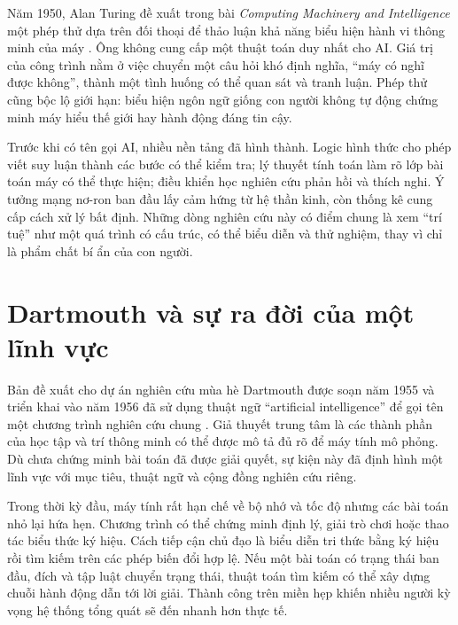 \documentclass[12pt,a4paper]{report}
\begin{document}
Năm 1950, Alan Turing đề xuất trong bài \textit{Computing Machinery and Intelligence} một phép thử dựa trên đối thoại để thảo luận khả năng biểu hiện hành vi thông minh của máy \cite{turing1950}. Ông không cung cấp một thuật toán duy nhất cho AI. Giá trị của công trình nằm ở việc chuyển một câu hỏi khó định nghĩa, ``máy có nghĩ được không'', thành một tình huống có thể quan sát và tranh luận. Phép thử cũng bộc lộ giới hạn: biểu hiện ngôn ngữ giống con người không tự động chứng minh máy hiểu thế giới hay hành động đáng tin cậy.

Trước khi có tên gọi AI, nhiều nền tảng đã hình thành. Logic hình thức cho phép viết suy luận thành các bước có thể kiểm tra; lý thuyết tính toán làm rõ lớp bài toán máy có thể thực hiện; điều khiển học nghiên cứu phản hồi và thích nghi. Ý tưởng mạng nơ-ron ban đầu lấy cảm hứng từ hệ thần kinh, còn thống kê cung cấp cách xử lý bất định. Những dòng nghiên cứu này có điểm chung là xem ``trí tuệ'' như một quá trình có cấu trúc, có thể biểu diễn và thử nghiệm, thay vì chỉ là phẩm chất bí ẩn của con người.

\section{Dartmouth và sự ra đời của một lĩnh vực}
Bản đề xuất cho dự án nghiên cứu mùa hè Dartmouth được soạn năm 1955 và triển khai vào năm 1956 đã sử dụng thuật ngữ ``artificial intelligence'' để gọi tên một chương trình nghiên cứu chung \cite{dartmouth1955}. Giả thuyết trung tâm là các thành phần của học tập và trí thông minh có thể được mô tả đủ rõ để máy tính mô phỏng. Dù chưa chứng minh bài toán đã được giải quyết, sự kiện này đã định hình một lĩnh vực với mục tiêu, thuật ngữ và cộng đồng nghiên cứu riêng.

Trong thời kỳ đầu, máy tính rất hạn chế về bộ nhớ và tốc độ nhưng các bài toán nhỏ lại hứa hẹn. Chương trình có thể chứng minh định lý, giải trò chơi hoặc thao tác biểu thức ký hiệu. Cách tiếp cận chủ đạo là biểu diễn tri thức bằng ký hiệu rồi tìm kiếm trên các phép biến đổi hợp lệ. Nếu một bài toán có trạng thái ban đầu, đích và tập luật chuyển trạng thái, thuật toán tìm kiếm có thể xây dựng chuỗi hành động dẫn tới lời giải. Thành công trên miền hẹp khiến nhiều người kỳ vọng hệ thống tổng quát sẽ đến nhanh hơn thực tế.
\end{document}
